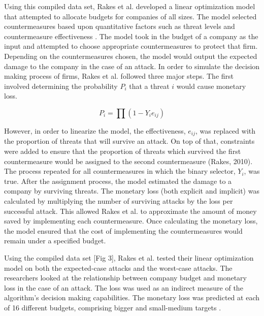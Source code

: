 \subsection*{\color{SubSectionBlue}{Linear Optimization Model}}
 \\

Using this compiled data set, Rakes et al. \cite{rakes_it_2012} developed a linear optimization model that attempted to allocate budgets for companies of all sizes. The model selected countermeasures based upon quantitative factors such as threat levels and countermeasure effectiveness \cite{rakes_it_2012}.  The model took in the budget of a company as the input and attempted to choose appropriate countermeasures to protect that firm. Depending on the countermeasures chosen, the model would output the expected damage to the company in the case of an attack. In order to simulate the decision making process of firms, Rakes et al. followed three major steps. The first involved determining the probability $P_i$ that a threat $i$ would cause monetary loss.

\begin{equation}
P_i = \prod(1 - Y_i e_{ij}) 
\end{equation}

However, in order to linearize the model, the effectiveness, $e_{ij}$, was replaced with the proportion of threats that will survive an attack. On top of that, constraints were added to ensure that the proportion of threats which survived the first countermeasure would be assigned to the second countermeasure (Rakes, 2010). The process repeated for all countermeasures in which the binary selector, $Y_i$, was true. After the assignment process, the model estimated the damage to a company by surviving threats. The monetary loss (both explicit and implicit) was calculated by multiplying the number of surviving attacks by the loss per successful attack. This allowed Rakes et al. to approximate the amount of money saved by implementing each countermeasure. Once calculating the monetary loss, the model ensured that the cost of implementing the countermeasures would remain under a specified budget. 
\vspace{1mm}

Using the compiled data set [Fig 3], Rakes et al. \cite{rakes_it_2012} tested their linear optimization model on both the expected-case attacks and the worst-case attacks. The researchers looked at the relationship between company budget and monetary loss in the case of an attack. The loss was used as an indirect measure of the algorithm’s decision making capabilities. The monetary loss was predicted at each of 16 different budgets, comprising bigger and small-medium targets \cite{rakes_it_2012}.

